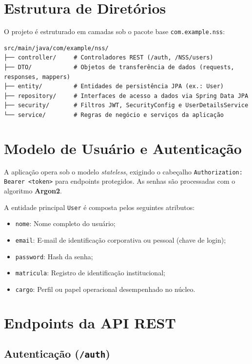 \documentclass[12pt,a4paper]{article}
\begin{document}
\section{Estrutura de Diretórios}

O projeto é estruturado em camadas sob o pacote base \texttt{com.example.nss}:

\begin{lstlisting}[language={}, numbers=none]
src/main/java/com/example/nss/
├── controller/     # Controladores REST (/auth, /NSS/users)
├── DTO/            # Objetos de transferência de dados (requests, responses, mappers)
├── entity/         # Entidades de persistência JPA (ex.: User)
├── repository/     # Interfaces de acesso a dados via Spring Data JPA
├── security/       # Filtros JWT, SecurityConfig e UserDetailsService
└── service/        # Regras de negócio e serviços da aplicação
\end{lstlisting}

\section{Modelo de Usuário e Autenticação}

A aplicação opera sob o modelo \textit{stateless}, exigindo o cabeçalho \texttt{Authorization: Bearer <token>} para endpoints protegidos. As senhas são processadas com o algoritmo \textbf{Argon2}.

A entidade principal \texttt{User} é composta pelos seguintes atributos:
\begin{itemize}[noitemsep]
\item \texttt{nome}: Nome completo do usuário;
\item \texttt{email}: E-mail de identificação corporativa ou pessoal (chave de login);
\item \texttt{password}: Hash da senha;
\item \texttt{matricula}: Registro de identificação institucional;
\item \texttt{cargo}: Perfil ou papel operacional desempenhado no núcleo.
\end{itemize}

\section{Endpoints da API REST}

\subsection{Autenticação (\texttt{/auth})}
\end{document}
